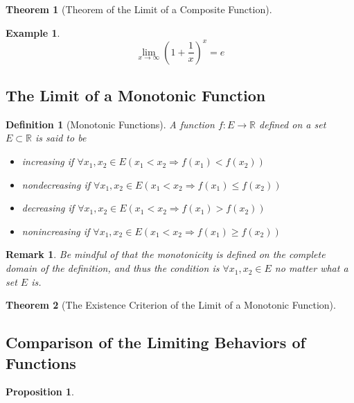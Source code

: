 \documentclass[onecolumn]{ctexart}
\newtheorem{definition}{Definition}
\newtheorem{theorem}{Theorem}
\newtheorem{proposition}{Proposition}
\newtheorem{remark}{Remark}
\newtheorem{example}{Example}
\begin{document}
\begin{theorem}[Theorem of the Limit of a Composite Function]
  
\end{theorem}

\begin{example}
  \begin{equation}
    \lim_{x \to \infty} (1 + \frac{1}{x})^x = e
  \end{equation}
\end{example}

\subsection{The Limit of a Monotonic Function}

\begin{definition}[Monotonic Functions]
  A function $f:E \to \mathbb{R}$ defined on a set $E \subset \mathbb{R}$ is 
  said to be
  \begin{itemize}
    \item increasing if $\forall x_1, x_2 \in E (x_1 < x_2 \Rightarrow f(x_1) < f(x_2))$
    \item nondecreasing if $\forall x_1, x_2 \in E (x_1 < x_2 \Rightarrow f(x_1) \leq f(x_2))$
    \item decreasing if $\forall x_1, x_2 \in E (x_1 < x_2 \Rightarrow f(x_1) > f(x_2))$
    \item nonincreasing if $\forall x_1, x_2 \in E (x_1 < x_2 \Rightarrow f(x_1) \geq f(x_2))$
  \end{itemize}
\end{definition}
\begin{remark}
  Be mindful of that the monotonicity is defined on the complete domain of the 
  definition, and thus the condition is $\forall x_1, x_2 \in E$ no matter what 
  a set $E$ is.
\end{remark}

\begin{theorem}[The Existence Criterion of the Limit of a Monotonic Function]
  
\end{theorem}

\subsection{Comparison of the Limiting Behaviors of Functions}

\begin{proposition}
  
\end{proposition}
\end{document}
